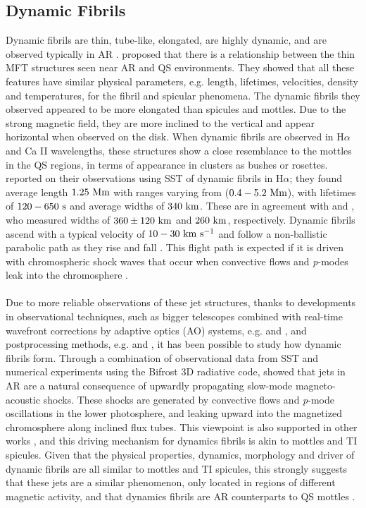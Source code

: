 \documentclass[12pt]{ociamthesis}
\newcommand{\kms}{~\rm{km ~s^{-1}}}
\newcommand{\np}{\\ \\}
\begin{document}
\subsection{Dynamic Fibrils}
\label{subsec:dfibs}
Dynamic fibrils are thin, tube-like, elongated, are highly dynamic, and are observed typically in AR \citep{De_Pontieu2007ApJ,Hansteen2006ApJ}. \cite{Foukal1971SoPh1959F,Foukal1971SoPh20298F} proposed that there is a relationship between the thin MFT structures seen near AR and QS environments. They showed that all these features have similar physical parameters, e.g. length, lifetimes, velocities, density and temperatures, for the fibril and spicular phenomena. The dynamic fibrils they observed appeared to be more elongated than spicules and mottles. Due to the strong magnetic field, they are more inclined to the vertical and appear horizontal when observed on the disk. When dynamic fibrils are observed in H$\alpha$ and Ca II wavelengths, these structures show a close resemblance to the mottles in the QS regions, in terms of appearance in clusters as bushes or rosettes. \cite{De_Pontieu2007ApJ} reported on their observations using SST of dynamic fibrils in H$\alpha$; they found average length $1.25~\rm{Mm}$ with ranges varying from ($0.4-5.2~\rm{Mm}$), with lifetimes of $120-650~\rm{s}$ and average widths of $340~\rm{km}$. These are in agreement with \cite{Morton2012NatCo31315M} and \cite{Gafeira2017ApJS2297G}, who measured widths of $360\pm120~\rm{km}$ and $260~\rm{km}$, respectively. Dynamic fibrils ascend with a typical velocity of $10-30\kms$ and follow a non-ballistic parabolic path as they rise and fall \cite{Beckers1968}. This flight path is expected if it is driven with chromospheric shock waves that occur when convective flows and \textit{p}-modes leak into the chromosphere \citep{Langangen2008ApJ6731194L,De_Pontieu2007ApJ}. \np
%
Due to more reliable observations of these jet structures, thanks to developments in observational techniques, such as bigger telescopes combined with real-time wavefront corrections by adaptive optics (AO) systems, e.g. \cite{Scharmer2003SPIE4853370S} and \cite{Rimmele2000SPIE4007218R}, and postprocessing methods, e.g. \cite{van2005SoPh228191V} and \cite{von1993AA268374V}, it has been possible to study how dynamic fibrils form. Through a combination of observational data from SST and numerical experiments using the Bifrost 3D radiative code, \cite{Hansteen2006ApJ} showed that jets in AR are a natural consequence of upwardly propagating slow-mode magneto-acoustic shocks. These shocks are generated by convective flows and \textit{p}-mode oscillations in the lower photosphere, and leaking upward into the magnetized chromosphere along inclined flux tubes. This viewpoint is also supported in other works \citep{Heggland2007ApJ6661277H,De_Pontieu2007ApJ,Pontieu2004Natur,Suematsu1990LNP367211S}, and this driving mechanism for dynamics fibrils is akin to mottles and TI spicules. Given that the physical properties, dynamics, morphology and driver of dynamic fibrils are all similar to mottles and TI spicules, this strongly suggests that these jets are a similar phenomenon, only located in regions of different magnetic activity, and that dynamics fibrils are AR counterparts to QS mottles \citep{Rouppe2007ApJ660L169R}.
\end{document}
